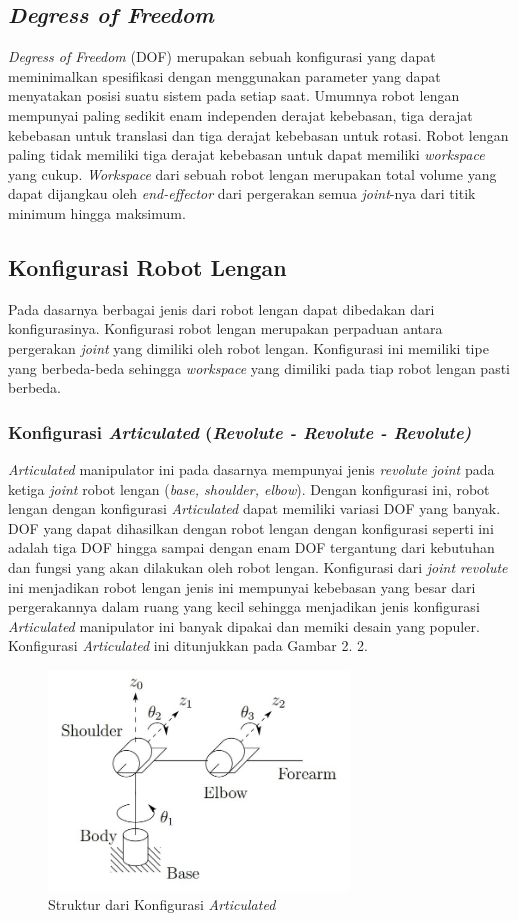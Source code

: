 \subsection{\emph{Degress of Freedom }}
\emph{Degress of Freedom} (DOF) merupakan sebuah konfigurasi yang dapat meminimalkan spesifikasi dengan menggunakan parameter yang dapat menyatakan posisi suatu sistem pada setiap saat. Umumnya robot lengan mempunyai paling sedikit enam independen derajat kebebasan, tiga derajat kebebasan untuk translasi dan tiga derajat kebebasan untuk rotasi. Robot lengan paling tidak memiliki tiga derajat kebebasan untuk dapat memiliki \emph{workspace} yang cukup. \emph{Workspace} dari sebuah robot lengan merupakan total volume yang dapat dijangkau oleh \emph{end-effector} dari pergerakan semua \emph{joint}-nya dari titik minimum hingga maksimum. 

\subsection{Konfigurasi Robot Lengan}
Pada dasarnya berbagai jenis dari robot lengan dapat dibedakan dari konfigurasinya. Konfigurasi robot lengan merupakan perpaduan antara pergerakan \emph{joint} yang dimiliki oleh robot lengan. Konfigurasi ini memiliki tipe yang berbeda-beda sehingga \emph {workspace} yang dimiliki pada tiap robot lengan pasti berbeda.

\subsubsection{Konfigurasi \emph{Articulated} (\emph{Revolute - Revolute - Revolute)}} 
\emph{Articulated} manipulator ini pada dasarnya mempunyai jenis \emph{revolute joint} pada ketiga \emph{joint} robot lengan (\emph {base, shoulder, elbow}). Dengan konfigurasi ini, robot lengan dengan konfigurasi \textit{Articulated} dapat memiliki variasi DOF yang banyak. DOF yang dapat dihasilkan dengan robot lengan dengan konfigurasi seperti ini adalah tiga DOF hingga sampai dengan enam DOF tergantung dari kebutuhan dan fungsi yang akan dilakukan oleh robot lengan. Konfigurasi dari \textit{joint revolute} ini menjadikan robot lengan jenis ini mempunyai kebebasan yang besar dari pergerakannya dalam ruang yang kecil sehingga menjadikan jenis konfigurasi \textit{Articulated} manipulator ini banyak dipakai dan memiki desain yang populer. Konfigurasi \textit{Articulated} ini ditunjukkan pada Gambar 2. 2.
	\begin{figure}[H]
	\centering
	\includegraphics[width=8cm]{gambar/articulated.jpg}
	\caption{Struktur dari Konfigurasi  \textit{Articulated}}
\end{figure}
